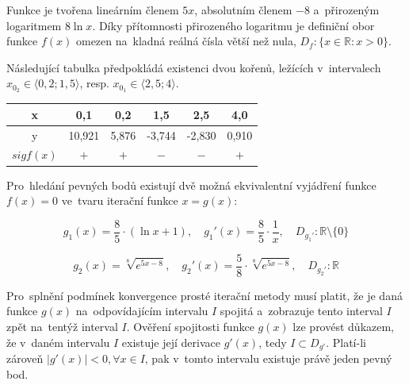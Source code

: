 \documentclass[a4paper,10pt]{article}
\begin{document}

\par Funkce je tvořena lineárním členem $5x$, absolutním členem $-8$ a~přirozeným
logaritmem $8\ln{x}$. Díky přítomnosti přirozeného logaritmu je definiční obor funkce
$f(x)$ omezen na~kladná reálná čísla větší než nula, $D_{f}: \{x {\in} \mathbb{R}: x>0\}$.


\par Následující tabulka předpokládá existenci dvou kořenů, ležících v~intervalech
$x_{0_2}{\in}{\langle}0,2; 1,5{\rangle}$, resp. $x_{0_1}{\in}{\langle}2,5; 4{\rangle}$.

\begin{center}
  \begin{tabular}{|c|c|c|c|c|c|}
    \hline
    x & 0,1 & 0,2 & 1,5 & 2,5 & 4,0 \\ \hline\hline
    y & 10,921 & 5,876 & -3,744 & -2,830 & 0,910 \\ \hline
    $sig f(x)$ & $+$ & $+$ & $-$ & $-$ & $+$ \\
    \hline
  \end{tabular}
\end{center}

\par Pro~hledání pevných bodů existují dvě možná ekvivalentní vyjádření funkce $f(x)=0$
ve~tvaru iterační funkce $x=g(x)$:

\begin{equation} 
g_1(x)=\dfrac{8}{5}{\cdot}(\ln{x}+1), \quad g_1'(x)=\dfrac{8}{5}\cdot\dfrac{1}{x},
\quad D_{g_1'}: \mathbb{R}{\setminus}\{0\}
\end{equation}

\begin{equation} 
g_2(x)=\sqrt[8]{e^{5x-8}},
\quad g_2'(x)=\dfrac{5}{8}\cdot\sqrt[8]{e^{5x-8}},
\quad D_{g_2'}: \mathbb{R}
\end{equation}

\par Pro~splnění podmínek konvergence prosté iterační metody musí platit, že je daná
funkce $g(x)$ na~odpovídajícím intervalu $I$ spojitá a~zobrazuje tento interval $I$ zpět
na~tentýž interval $I$. Ověření spojitosti funkce $g(x)$ lze provést důkazem, že v~daném
intervalu $I$ existuje její derivace $g'(x)$, tedy $I{\subset}D_{g'}$. Platí-li zároveň
$|g'(x)|<0, {\forall}x{\in}I$, pak v~tomto intervalu existuje právě jeden pevný bod.
\end{document}
